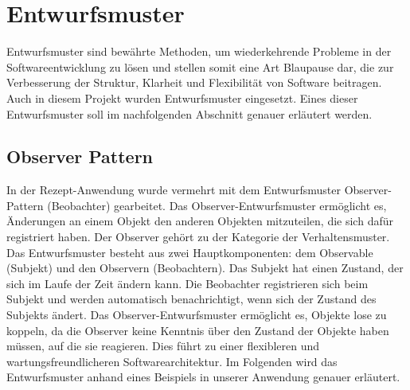 \chapter{Entwurfsmuster}
Entwurfsmuster sind bewährte Methoden, um wiederkehrende Probleme in der Softwareentwicklung zu lösen und stellen somit eine Art Blaupause dar, die zur Verbesserung der Struktur, Klarheit und Flexibilität von Software beitragen. Auch in diesem Projekt wurden Entwurfsmuster eingesetzt. Eines dieser Entwurfsmuster soll im nachfolgenden Abschnitt genauer erläutert werden.

\section{Observer Pattern}
In der Rezept-Anwendung wurde vermehrt mit dem Entwurfsmuster Observer-Pattern (Beobachter) gearbeitet. Das Observer-Entwurfsmuster ermöglicht es, Änderungen an einem Objekt den anderen Objekten mitzuteilen, die sich dafür registriert haben. Der Observer gehört zu der Kategorie der Verhaltensmuster. Das Entwurfsmuster besteht aus zwei Hauptkomponenten: dem Observable (Subjekt) und den Observern (Beobachtern). 
Das Subjekt hat einen Zustand, der sich im Laufe der Zeit ändern kann. Die Beobachter registrieren sich beim Subjekt und werden automatisch benachrichtigt, wenn sich der Zustand des Subjekts ändert. Das Observer-Entwurfsmuster ermöglicht es, Objekte lose zu koppeln, da die Observer keine Kenntnis über den Zustand der Objekte haben müssen, auf die sie reagieren. Dies führt zu einer flexibleren und wartungsfreundlicheren Softwarearchitektur.
Im Folgenden wird das Entwurfsmuster anhand eines Beispiels in unserer Anwendung genauer erläutert. 

